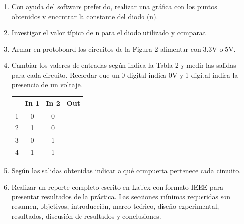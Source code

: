 \documentclass[letterpaper, 12 pt, conference]{ieeeconf}  %
\begin{document}
\begin{enumerate}
    \item Con ayuda del software preferido, realizar una gráfica con los puntos obtenidos y encontrar la constante del diodo (n).
    \item Investigar el valor típico de n para el diodo utilizado y comparar.
    \item Armar en protoboard los circuitos de la Figura 2 alimentar con 3.3V o 5V.
    \item Cambiar los valores de entradas según indica la Tabla 2 y medir las salidas para cada circuito. Recordar que un 0 digital indica 0V y 1 digital indica la presencia de un voltaje.
    
\begin{table}[h!]
\centering
\begin{tabular}{|c|c|c|c|}
\hline
\multicolumn{1}{|l|}{\textbf{}} & \multicolumn{1}{l|}{\textbf{In 1}} & \multicolumn{1}{l|}{\textbf{In 2}} & \textbf{Out} \\ \hline
1                               & 0                                  & 0                                  & \textbf{}    \\ \hline
2                               & 1                                  & 0                                  & \textbf{}    \\ \hline
3                               & 0                                  & 1                                  & \textbf{}    \\ \hline
4                               & 1                                  & 1                                  & \textbf{}    \\ \hline
\end{tabular}
\end{table}
    
    \item Según las salidas obtenidas indicar a qué compuerta pertenece cada circuito.
    \item Realizar un reporte completo escrito en LaTex con formato IEEE para presentar resultados de la práctica. Las secciones mínimas requeridas son resumen, objetivos, introducción, marco teórico, diseño experimental, resultados, discusión de resultados y conclusiones.
    
\end{enumerate}
\addtolength{\textheight}{-12cm}   %
\end{document}
